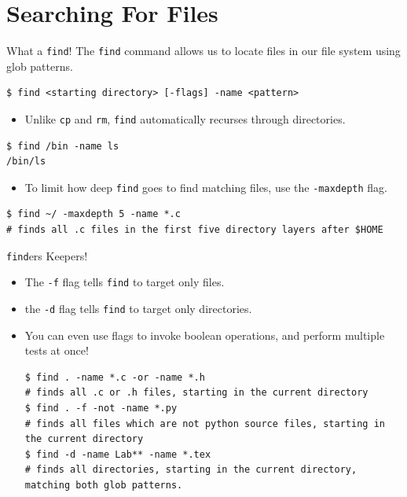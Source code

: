 \documentclass[11pt]{beamer}
\begin{document}
\section[Find]{Searching For Files}
\begin{frame}[fragile=singleslide]{What a \texttt{find}!}
The \texttt{find} command allows us to locate files in our file system using glob patterns. 
\begin{lstlisting}[style=terminal]
$ find <starting directory> [-flags] -name <pattern>
\end{lstlisting}
\begin{itemize}
\item Unlike \texttt{cp} and \texttt{rm}, \texttt{find} automatically recurses through directories.  
\end{itemize}
\begin{lstlisting}[style=terminal]
$ find /bin -name ls
/bin/ls
\end{lstlisting}
\begin{itemize}
\item To limit how deep \texttt{find} goes to find matching files, use the \texttt{-maxdepth} flag.
\end{itemize}
\begin{lstlisting}[style=terminal]
$ find ~/ -maxdepth 5 -name *.c
# finds all .c files in the first five directory layers after $HOME
\end{lstlisting}
\end{frame}

\begin{frame}[fragile=singleslide]{\texttt{find}ers Keepers!}
\begin{itemize}
\item The \texttt{-f} flag tells \texttt{find} to target only files.
\item the \texttt{-d} flag tells \texttt{find} to target only directories.  
\item You can even use flags to invoke boolean operations, and perform multiple tests at once! 
\begin{lstlisting}[style=terminal]
$ find . -name *.c -or -name *.h
# finds all .c or .h files, starting in the current directory
$ find . -f -not -name *.py 
# finds all files which are not python source files, starting in the current directory
$ find -d -name Lab** -name *.tex
# finds all directories, starting in the current directory, matching both glob patterns.  
\end{lstlisting}
\end{itemize}
\end{frame}
\end{document}
